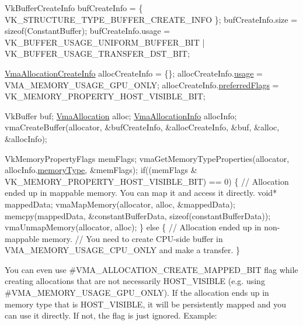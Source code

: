 \begin{DoxyCode}
VkBufferCreateInfo bufCreateInfo = \{ VK\_STRUCTURE\_TYPE\_BUFFER\_CREATE\_INFO \};
bufCreateInfo.size = \textcolor{keyword}{sizeof}(ConstantBuffer);
bufCreateInfo.usage = VK\_BUFFER\_USAGE\_UNIFORM\_BUFFER\_BIT | VK\_BUFFER\_USAGE\_TRANSFER\_DST\_BIT;

\hyperlink{structVmaAllocationCreateInfo}{VmaAllocationCreateInfo} allocCreateInfo = \{\};
allocCreateInfo.\hyperlink{structVmaAllocationCreateInfo_accb8b06b1f677d858cb9af20705fa910}{usage} = VMA\_MEMORY\_USAGE\_GPU\_ONLY;
allocCreateInfo.\hyperlink{structVmaAllocationCreateInfo_a7fe8d81a1ad10b2a2faacacee5b15d6d}{preferredFlags} = VK\_MEMORY\_PROPERTY\_HOST\_VISIBLE\_BIT;

VkBuffer buf;
\hyperlink{structVmaAllocation}{VmaAllocation} alloc;
\hyperlink{structVmaAllocationInfo}{VmaAllocationInfo} allocInfo;
vmaCreateBuffer(allocator, &bufCreateInfo, &allocCreateInfo, &buf, &alloc, &allocInfo);

VkMemoryPropertyFlags memFlags;
vmaGetMemoryTypeProperties(allocator, allocInfo.\hyperlink{structVmaAllocationInfo_a7f6b0aa58c135e488e6b40a388dad9d5}{memoryType}, &memFlags);
\textcolor{keywordflow}{if}((memFlags & VK\_MEMORY\_PROPERTY\_HOST\_VISIBLE\_BIT) == 0)
\{
    \textcolor{comment}{// Allocation ended up in mappable memory. You can map it and access it directly.}
    \textcolor{keywordtype}{void}* mappedData;
    vmaMapMemory(allocator, alloc, &mappedData);
    memcpy(mappedData, &constantBufferData, \textcolor{keyword}{sizeof}(constantBufferData));
    vmaUnmapMemory(allocator, alloc);
\}
\textcolor{keywordflow}{else}
\{
    \textcolor{comment}{// Allocation ended up in non-mappable memory.}
    \textcolor{comment}{// You need to create CPU-side buffer in VMA\_MEMORY\_USAGE\_CPU\_ONLY and make a transfer.}
\}
\end{DoxyCode}


You can even use \#\+V\+M\+A\+\_\+\+A\+L\+L\+O\+C\+A\+T\+I\+O\+N\+\_\+\+C\+R\+E\+A\+T\+E\+\_\+\+M\+A\+P\+P\+E\+D\+\_\+\+B\+IT flag while creating allocations that are not necessarily {\ttfamily H\+O\+S\+T\+\_\+\+V\+I\+S\+I\+B\+LE} (e.\+g. using \#\+V\+M\+A\+\_\+\+M\+E\+M\+O\+R\+Y\+\_\+\+U\+S\+A\+G\+E\+\_\+\+G\+P\+U\+\_\+\+O\+N\+LY). If the allocation ends up in memory type that is {\ttfamily H\+O\+S\+T\+\_\+\+V\+I\+S\+I\+B\+LE}, it will be persistently mapped and you can use it directly. If not, the flag is just ignored. Example\+:


